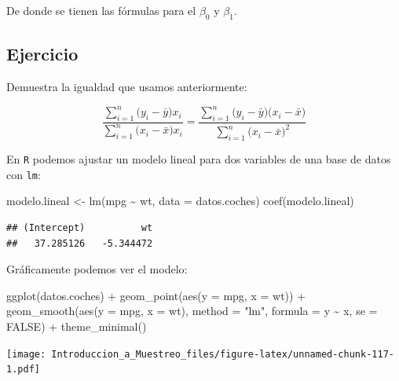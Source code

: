 \documentclass[
]{book}
\newenvironment{Shaded}{\begin{snugshade}}{\end{snugshade}}
\newcommand{\AttributeTok}[1]{\textcolor[rgb]{0.77,0.63,0.00}{#1}}
\newcommand{\ConstantTok}[1]{\textcolor[rgb]{0.00,0.00,0.00}{#1}}
\newcommand{\FunctionTok}[1]{\textcolor[rgb]{0.00,0.00,0.00}{#1}}
\newcommand{\NormalTok}[1]{#1}
\newcommand{\OtherTok}[1]{\textcolor[rgb]{0.56,0.35,0.01}{#1}}
\newcommand{\SpecialCharTok}[1]{\textcolor[rgb]{0.00,0.00,0.00}{#1}}
\newcommand{\StringTok}[1]{\textcolor[rgb]{0.31,0.60,0.02}{#1}}
\begin{document}
De donde se tienen las fórmulas para el \(\beta_0\) y \(\beta_1\).

\hypertarget{ejercicio-2}{%
\subsection{Ejercicio}\label{ejercicio-2}}

Demuestra la igualdad que usamos anteriormente:

\[
\dfrac{\sum_{i=1}^n \Big( y_i  - \bar{y} \Big) x_i}{\sum_{i=1}^n\Big(   x_i -   \bar{x} \Big)x_i} = \dfrac{\sum_{i=1}^n \Big( y_i  - \bar{y} \Big)\Big(   x_i -   \bar{x} \Big)}{\sum_{i=1}^n\Big(   x_i -   \bar{x} \Big)^2} 
\]

En \texttt{R} podemos ajustar un modelo lineal para dos variables de una base de datos con \texttt{lm}:

\begin{Shaded}
\begin{Highlighting}[]
\NormalTok{modelo.lineal }\OtherTok{\textless{}{-}} \FunctionTok{lm}\NormalTok{(mpg }\SpecialCharTok{\textasciitilde{}}\NormalTok{ wt, }\AttributeTok{data =}\NormalTok{ datos.coches)}
\FunctionTok{coef}\NormalTok{(modelo.lineal)}
\end{Highlighting}
\end{Shaded}

\begin{verbatim}
## (Intercept)          wt 
##   37.285126   -5.344472
\end{verbatim}

Gráficamente podemos ver el modelo:

\begin{Shaded}
\begin{Highlighting}[]
\FunctionTok{ggplot}\NormalTok{(datos.coches) }\SpecialCharTok{+}
  \FunctionTok{geom\_point}\NormalTok{(}\FunctionTok{aes}\NormalTok{(}\AttributeTok{y =}\NormalTok{ mpg, }\AttributeTok{x =}\NormalTok{ wt)) }\SpecialCharTok{+}
  \FunctionTok{geom\_smooth}\NormalTok{(}\FunctionTok{aes}\NormalTok{(}\AttributeTok{y =}\NormalTok{ mpg, }\AttributeTok{x =}\NormalTok{ wt), }\AttributeTok{method =} \StringTok{"lm"}\NormalTok{, }
              \AttributeTok{formula =}\NormalTok{ y }\SpecialCharTok{\textasciitilde{}}\NormalTok{ x, }\AttributeTok{se =} \ConstantTok{FALSE}\NormalTok{) }\SpecialCharTok{+}
  \FunctionTok{theme\_minimal}\NormalTok{()}
\end{Highlighting}
\end{Shaded}

\texttt{[image: Introduccion\_a\_Muestreo\_files/figure-latex/unnamed-chunk-117-1.pdf]}
\end{document}
